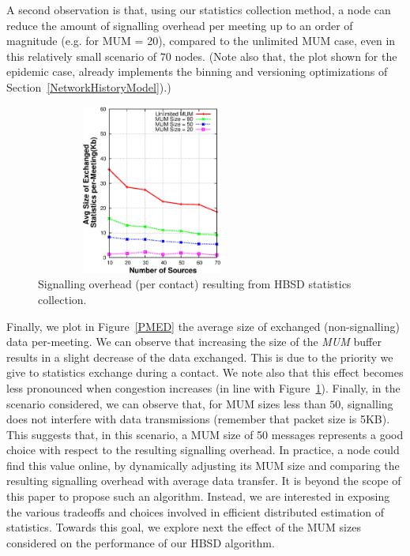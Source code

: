 A second observation is that, using our statistics collection method, a node can reduce the amount of signalling overhead per meeting up to an order of magnitude (e.g. for MUM = 20), compared to the unlimited MUM case, even in this relatively small scenario of $70$ nodes. (Note also that, the plot shown for the epidemic case, already implements the binning and versioning optimizations of Section~\ref{NetworkHistoryModel}).)

\begin{figure}[!h]
\centering
\includegraphics[width=3in,height=2.2in]{Chapitre3/fig7.eps}
\caption{Signalling overhead (per contact) resulting from HBSD statistics collection.}
\label{StatOverhead}
\end{figure}

Finally, we plot in Figure~\ref{PMED} the average size of exchanged (non-signalling) data per-meeting. We can observe that increasing the size of the \emph{MUM} buffer results in a slight decrease of the data exchanged. This is due to the priority we give to statistics exchange during a contact. We note also that this effect becomes less pronounced when congestion increases (in line with Figure~\ref{StatOverhead}). Finally, in the scenario considered, we can observe that, for MUM sizes less than $50$, signalling does not interfere with data transmissions (remember that packet size is 5KB). This suggests that, in this scenario, a MUM size of 50 messages represents a good choice with respect to the resulting signalling overhead. In practice, a node could find this value online, by dynamically adjusting its MUM size and comparing the resulting signalling overhead with average data transfer. It is beyond the scope of this paper to propose such an algorithm. Instead, we are interested in exposing the various tradeoffs and choices involved in efficient distributed estimation of statistics. Towards this goal, we explore next the effect of the MUM sizes considered on the performance of our HBSD algorithm.



